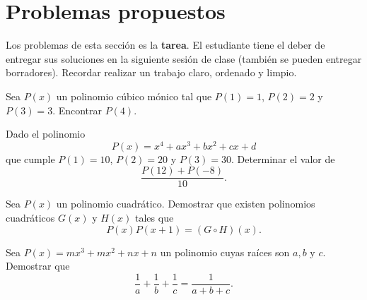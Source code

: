 \section{Problemas propuestos}

Los problemas de esta sección es la \textbf{tarea}.
El estudiante tiene el deber de entregar sus soluciones en la siguiente sesión de clase (también se pueden entregar borradores).
Recordar realizar un trabajo claro, ordenado y limpio.

\begin{multicols}{2}

    \begin{problem}
        Sea $P(x)$ un polinomio cúbico mónico tal que $P(1) = 1$, $P(2) = 2$ y $P(3) = 3$.
        Encontrar $P(4).$
    \end{problem}

    \begin{problem}
        Dado el polinomio
        \[
            P(x) = x^4 + ax^3 + bx^2 + cx + d
        \]
        que cumple $P(1) = 10$, $P(2) = 20$ y $P(3) = 30$.
        Determinar el valor de
        \[
            \frac{P(12) + P(-8)}{10}.
        \]
    \end{problem}

    \begin{problem}
        Sea $P(x)$ un polinomio cuadrático.
        Demostrar que existen polinomios cuadráticos $G(x)$ y $H(x)$ tales que
        \[
            P(x)P(x+1) = (G \circ H)(x).
        \]
    \end{problem}

    \begin{problem}
        Sea $P(x) = mx^3 + mx^2 + nx + n$ un polinomio cuyas raíces son $a, b \mbox{ y } c$.
        Demostrar que
        \[\frac{1}{a} + \frac{1}{b} + \frac{1}{c} = \frac{1}{a + b + c}.\]
    \end{problem}
\end{multicols}